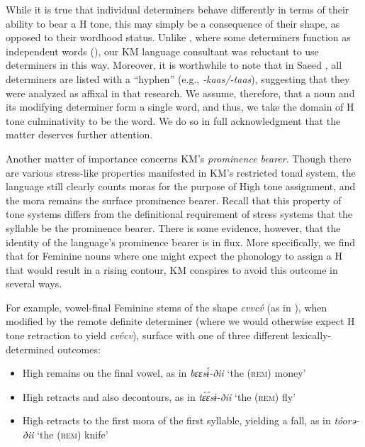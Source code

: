 \documentclass[output=paper,colorlinks,citecolor=brown]{langscibook}
\begin{document}
While it is true that individual determiners behave differently in terms of their ability to bear a H tone, this may simply be a consequence of their shape, as opposed to their wordhood status. Unlike , where some determiners function as independent words (\citealt{GreenMorrison2016}), our KM language consultant was reluctant to use determiners in this way. Moreover, it is worthwhile to note that in Saeed \citeyearpar[90--91]{Saeed1982}, all determiners are listed with a ``hyphen'' (e.g., \textit{-kaas/\nobreakdash-taas}), suggesting that they were analyzed as affixal in that research. We assume, therefore, that a noun and its modifying determiner form a single word, and thus, we take the domain of H tone culminativity to be the word. We do so in full acknowledgment that the matter deserves further attention.

Another matter of importance  concerns KM's \textit{prominence bearer}. Though there are various stress-like properties manifested in KM's restricted tonal system, the language still clearly counts moras for the purpose of High tone assignment, and the mora remains the surface prominence bearer. Recall that this property of tone systems differs from the definitional requirement of stress systems that the syllable be the prominence bearer. There is some evidence, however, that the identity of the language's prominence bearer is in flux. More specifically, we find that for Feminine nouns where one might expect the phonology to assign a H that would result in a rising contour, KM conspires to avoid this outcome in several ways. 

For example, vowel-final Feminine stems of the shape \textit{cvvcv́} (as in ), when modified by the remote definite determiner (where we would otherwise expect H tone retraction to yield \textit{cvv́cv}), surface with one of  three different lexically-determined outcomes:

\begin{itemize}
    \item High remains on the final vowel, as in \textit{bɛɛsɨ́-ðii} `the (\textsc{rem}) money'
    \item High retracts and also decontours, as in \textit{tɛ́ɛ́sɨ-ðii} `the (\textsc{rem}) fly' 
    \item High retracts to the first mora of the first syllable, yielding a fall, as in \textit{tóorə-ðii} `the (\textsc{rem}) knife' 
\end{itemize}
\end{document}

